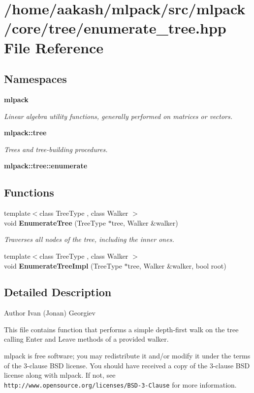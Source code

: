 \section{/home/aakash/mlpack/src/mlpack/core/tree/enumerate\+\_\+tree.hpp File Reference}
\label{enumerate__tree_8hpp}
\subsection*{Namespaces}
\begin{DoxyCompactItemize}
\item 
 \textbf{ mlpack}
\begin{DoxyCompactList}\small\item\em Linear algebra utility functions, generally performed on matrices or vectors. \end{DoxyCompactList}\item 
 \textbf{ mlpack\+::tree}
\begin{DoxyCompactList}\small\item\em Trees and tree-\/building procedures. \end{DoxyCompactList}\item 
 \textbf{ mlpack\+::tree\+::enumerate}
\end{DoxyCompactItemize}
\subsection*{Functions}
\begin{DoxyCompactItemize}
\item 
{\footnotesize template$<$class Tree\+Type , class Walker $>$ }\\void \textbf{ Enumerate\+Tree} (Tree\+Type $\ast$tree, Walker \&walker)
\begin{DoxyCompactList}\small\item\em Traverses all nodes of the tree, including the inner ones. \end{DoxyCompactList}\item 
{\footnotesize template$<$class Tree\+Type , class Walker $>$ }\\void \textbf{ Enumerate\+Tree\+Impl} (Tree\+Type $\ast$tree, Walker \&walker, bool root)
\end{DoxyCompactItemize}


\subsection{Detailed Description}
\begin{DoxyAuthor}{Author}
Ivan (Jonan) Georgiev
\end{DoxyAuthor}
This file contains function that performs a simple depth-\/first walk on the tree calling {\ttfamily Enter} and {\ttfamily Leave} methods of a provided walker.

mlpack is free software; you may redistribute it and/or modify it under the terms of the 3-\/clause B\+SD license. You should have received a copy of the 3-\/clause B\+SD license along with mlpack. If not, see {\tt http\+://www.\+opensource.\+org/licenses/\+B\+S\+D-\/3-\/\+Clause} for more information. 